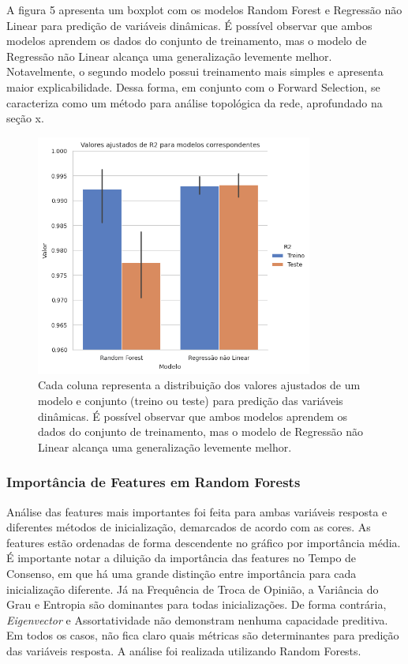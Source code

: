 A figura 5 apresenta um boxplot com os modelos Random Forest e Regressão
não Linear para predição de variáveis dinâmicas. É possível observar que
ambos modelos aprendem os dados do conjunto de treinamento, mas o modelo
de Regressão não Linear alcança uma generalização levemente melhor.
Notavelmente, o segundo modelo possui treinamento mais simples e
apresenta maior explicabilidade. Dessa forma, em conjunto com o Forward
Selection, se caracteriza como um método para análise topológica da
rede, aprofundado na seção x.

\begin{figure}
\centering
\includegraphics[width=\textwidth,height=3.125in]{compare.png}
\caption{Cada coluna representa a distribuição dos valores ajustados de
um modelo e conjunto (treino ou teste) para predição das variáveis
dinâmicas. É possível observar que ambos modelos aprendem os dados do
conjunto de treinamento, mas o modelo de Regressão não Linear alcança
uma generalização levemente melhor.}
\end{figure}

\subsubsection{Importância de Features em Random
Forests}\label{importuxe2ncia-de-features-em-random-forests}

Análise das features mais importantes foi feita para ambas variáveis
resposta e diferentes métodos de inicialização, demarcados de acordo com
as cores. As features estão ordenadas de forma descendente no gráfico
por importância média. É importante notar a diluição da importância das
features no Tempo de Consenso, em que há uma grande distinção entre
importância para cada inicialização diferente. Já na Frequência de Troca
de Opinião, a Variância do Grau e Entropia são dominantes para todas
inicializações. De forma contrária, \emph{Eigenvector} e Assortatividade
não demonstram nenhuma capacidade preditiva. Em todos os casos, não fica
claro quais métricas são determinantes para predição das variáveis
resposta. A análise foi realizada utilizando Random Forests.

